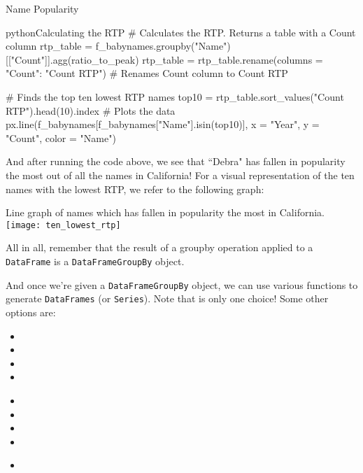 \documentclass[openany]{book}
\begin{document}
\begin{casestudy*}{Name Popularity}{}
\begin{code}{python}{Calculating the RTP}
# Calculates the RTP. Returns a table with a Count column
rtp_table = f_babynames.groupby("Name")[["Count"]].agg(ratio_to_peak)
rtp_table = rtp_table.rename(columns = {"Count": "Count RTP"}) # Renames Count column to Count RTP

# Finds the top ten lowest RTP names
top10 = rtp_table.sort_values("Count RTP").head(10).index
# Plots the data
px.line(f_babynames[f_babynames["Name"].isin(top10)], x = "Year", y = "Count", color = "Name")
\end{code}

And after running the code above, we see that ``Debra" has fallen in popularity the most out of all the names in California! For a visual representation of the ten names with the lowest RTP, we refer to the following graph:
\begin{figurebox}[nofloat]{Line graph of names which has fallen in popularity the most in California.}
	\centering\texttt{[image: ten\_lowest\_rtp]}
\end{figurebox}
\end{casestudy*}

All in all, remember that the result of a groupby operation applied to a \texttt{DataFrame} is a \texttt{DataFrameGroupBy} object.

And once we're given a \texttt{DataFrameGroupBy} object, we can use various functions to generate \texttt{DataFrames} (or \texttt{Series}). Note that  is only one choice! Some other options are:

\begin{paracol}{3}
	\begin{itemize}
		\item {}
		\item {}
		\item {}
		\item {}
	\end{itemize}
	\switchcolumn
	\begin{itemize}
		\item {}
		\item {}
		\item {}
		\item {}
	\end{itemize}
	\switchcolumn
	\begin{itemize}
		\item {}
	\end{itemize}
\end{paracol}
\end{document}
